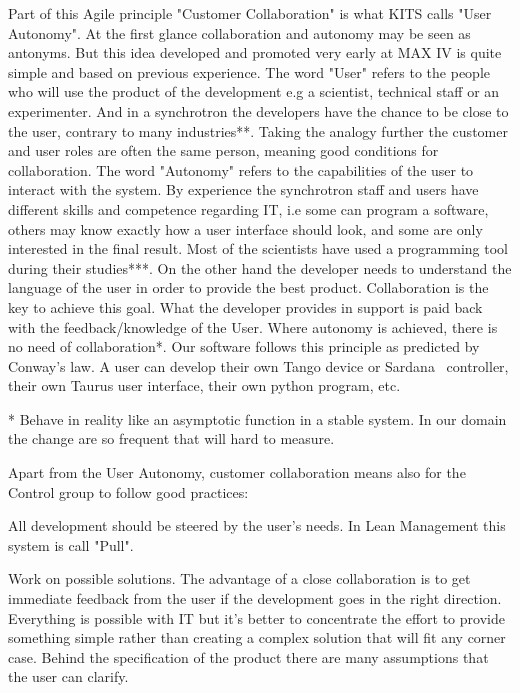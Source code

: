\documentclass[a4paper,
              ]{jacow}
\begin{document}
Part of this Agile principle "Customer Collaboration" is what KITS calls "User Autonomy".
At the first glance collaboration and autonomy may be seen as antonyms. But this idea developed and promoted very early at MAX IV is quite simple and based on previous experience. 
The word "User" refers to the people who will use the product of the development e.g a scientist, technical staff or an experimenter. And in a synchrotron the developers have the chance to be close to the user, contrary to many industries**. Taking the analogy further the customer and user roles are often the same person, meaning good conditions for collaboration.
The word "Autonomy" refers to the capabilities of the user to interact with the system. By experience the synchrotron staff and users have different skills and competence regarding IT, i.e some can program a software, others may know exactly how a user interface should look, and some are only interested in the final result. Most of the scientists have used a programming tool during their studies***. On the other hand the developer needs to understand the language of the user in order to provide the best product. Collaboration is the key to achieve this goal. What the developer provides in support is paid back with the feedback/knowledge of the User. Where autonomy is achieved, there is no need of collaboration*.
Our software follows this principle as predicted by Conway's law. A user can develop their own Tango device or Sardana~\cite{sardana} controller, their own Taurus user interface, their own python program, etc.

* Behave in reality like an asymptotic function in a stable system. In our domain the change are so frequent that will hard to measure.

Apart from the User Autonomy, customer collaboration means also for the Control group to follow good practices:
\begin{Itemize}
      \item All development should be steered by the user's needs. In Lean Management this system is call "Pull".
      \item Work on possible solutions. The advantage of a close collaboration is to get immediate feedback from the user if the development goes in the right direction. Everything is possible with IT but it's better to concentrate the effort to provide something simple rather than creating a complex solution that will fit any corner case. Behind the specification of the product there are many assumptions that the user can clarify.
\end{Itemize}
\end{document}

